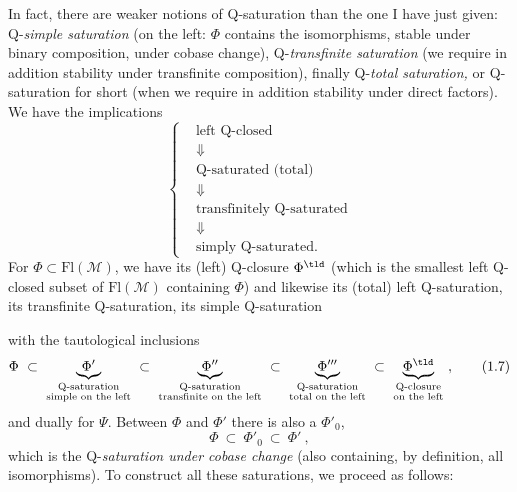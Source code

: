 In fact, there are weaker notions of Q-saturation than the one I have just given: Q-\textit{simple saturation} (on the left: $\Phi$ contains the isomorphisms, stable under binary composition, under cobase change), Q-\textit{transfinite saturation} (we require in addition stability under transfinite composition), finally Q-\textit{total saturation,} or Q-saturation for short (when we require in addition stability under direct factors). We have the implications
\[
\left\{
\begin{aligned}
&\text{left Q-closed}\\
&\Downarrow\\
&\text{Q-saturated (total)}\\
&\Downarrow\\
&\text{transfinitely Q-saturated}\\
&\Downarrow\\
&\text{simply Q-saturated.}
\end{aligned}
\right.
\tag*{(1.6)}
\]
For $\Phi \subset \mathrm{Fl}(\mathcal{M})$, we have its (left) Q-closure $\Phi^{\tld}$ (which is the smallest left Q-closed subset of $\mathrm{Fl}(\mathcal{M})$ containing $\Phi$) and likewise its (total) left Q-saturation, its transfinite Q-saturation, its simple Q-saturation


with the tautological inclusions
\[
\Phi \ \subset \
\underbrace{\Phi'}_{\substack{\text{Q-saturation}\\ \text{simple on the left}}}
\ \subset \
\underbrace{\Phi''}_{\substack{\text{Q-saturation}\\ \text{transfinite on the left}}}
\ \subset \
\underbrace{\Phi'''}_{\substack{\text{Q-saturation}\\ \text{total on the left}}}
\ \subset \
\underbrace{\Phi^{\tld}}_{\substack{\text{Q-closure}\\ \text{on the left}}}
\ ,
\tag*{(1.7)}
\]
and dually for $\Psi$. Between $\Phi$ and $\Phi'$ there is also a $\Phi'_0$,
\[
\Phi \ \subset \ \Phi'_0 \ \subset \ \Phi'\ ,
\tag*{(1.8)}
\]
which is the Q-\textit{saturation under cobase change} (also containing, by definition, all isomorphisms). To construct all these saturations, we proceed as follows:

\newpage

\printedpage{3}

